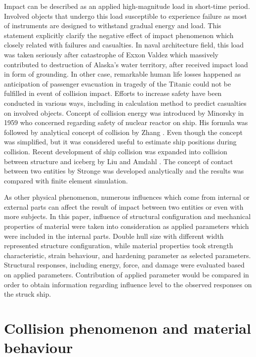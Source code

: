 \documentclass[10pt,journal]{IEEEtran}
\begin{document}
Impact can be described as an applied high-magnitude load in short-time period. Involved objects that undergo this load susceptible to experience failure as most of instruments are 
designed to withstand gradual energy and load. This statement explicitly clarify the negative effect of impact phenomenon which closely related with failures and casualties. 
In naval architecture field, this load was taken seriously after catastrophe of Exxon Valdez which massively contributed to destruction of Alaska's water territory, after received impact load in form of grounding. 
In other case, remarkable human life losses happened as anticipation of pas­senger evacuation in tragedy of the Titanic could not be fulfilled in event of collision impact. 
Efforts to increase safety have been conducted in various ways, including in calculation method to predict casualties on involved objects. Concept of collision energy was introduced by Minorsky \cite{minorsky1958analysis} 
in 1959 who concerned regarding safety of nuclear reactor on ship. His for­mula was followed by analytical concept of collision by Zhang \cite{zhang1999mechanics}. 
Even though the concept was simplified, but it was considered useful to estimate ship positions during collision. Recent development of ship collision was expanded into collision between structure and iceberg by Liu and Amdahl \cite{liu2010new}. 
The concept of contact between two entities by Stronge \cite{coaplen2004work} was developed analytically and the results was compared with finite element simulation. 

As other physical phenomenon, numerous influences which come from internal or external parts can affect the result of impact between two entities or even with more subjects. 
In this paper, influence of structural configuration and mechanical properties of material were taken into consideration as applied parameters which were included in the internal parts. 
Double hull size with different width represented structure configuration, while material properties took strength characteristic, strain behaviour, and hardening parameter as selected parameters. 
Structural responses, including energy, force, and damage were evaluated based on applied parameters. 
Contribution of applied parameter would be compared in order to obtain information regarding influence level to the observed responses on the struck ship. 

\section{Collision phenomenon and material behaviour}
\end{document}

